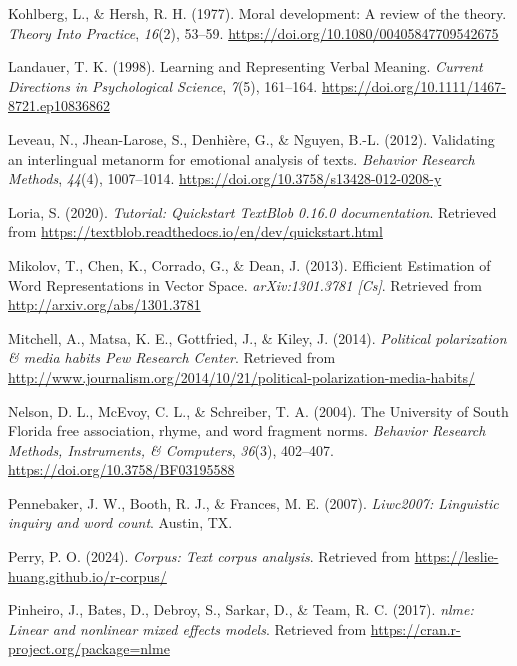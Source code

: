 \documentclass[
  man,floatsintext]{apa6}
\newlength{\cslhangindent}
\newenvironment{CSLReferences}[2] %
 {\begin{list}{}{%
  \setlength{\itemindent}{0pt}
  \setlength{\leftmargin}{0pt}
  \setlength{\parsep}{0pt}
  \ifodd #1
   \setlength{\leftmargin}{\cslhangindent}
   \setlength{\itemindent}{-1\cslhangindent}
  \fi
  \setlength{\itemsep}{#2\baselineskip}}}
 {\end{list}}
\begin{document}
\begin{CSLReferences}{1}{0}
Kohlberg, L., \& Hersh, R. H. (1977). {Moral development: A review of the theory}. \emph{Theory Into Practice}, \emph{16}(2), 53--59. \url{https://doi.org/10.1080/00405847709542675}

Landauer, T. K. (1998). {Learning and Representing Verbal Meaning}. \emph{Current Directions in Psychological Science}, \emph{7}(5), 161--164. \url{https://doi.org/10.1111/1467-8721.ep10836862}

Leveau, N., Jhean-Larose, S., Denhière, G., \& Nguyen, B.-L. (2012). Validating an interlingual metanorm for emotional analysis of texts. \emph{Behavior Research Methods}, \emph{44}(4), 1007--1014. \url{https://doi.org/10.3758/s13428-012-0208-y}

Loria, S. (2020). \emph{Tutorial: Quickstart {\textemdash} TextBlob 0.16.0 documentation}. Retrieved from \url{https://textblob.readthedocs.io/en/dev/quickstart.html}

Mikolov, T., Chen, K., Corrado, G., \& Dean, J. (2013). Efficient {Estimation} of {Word} {Representations} in {Vector} {Space}. \emph{arXiv:1301.3781 {[}Cs{]}}. Retrieved from \url{http://arxiv.org/abs/1301.3781}

Mitchell, A., Matsa, K. E., Gottfried, J., \& Kiley, J. (2014). \emph{{Political polarization {\&} media habits \textbar{} Pew Research Center}}. Retrieved from \url{http://www.journalism.org/2014/10/21/political-polarization-media-habits/}

Nelson, D. L., McEvoy, C. L., \& Schreiber, T. A. (2004). The University of South Florida free association, rhyme, and word fragment norms. \emph{Behavior Research Methods, Instruments, \& Computers}, \emph{36}(3), 402--407. \url{https://doi.org/10.3758/BF03195588}

Pennebaker, J. W., Booth, R. J., \& Frances, M. E. (2007). \emph{{Liwc2007: Linguistic inquiry and word count}}. Austin, TX.

Perry, P. O. (2024). \emph{Corpus: Text corpus analysis}. Retrieved from \url{https://leslie-huang.github.io/r-corpus/}

Pinheiro, J., Bates, D., Debroy, S., Sarkar, D., \& Team, R. C. (2017). \emph{{nlme: Linear and nonlinear mixed effects models}}. Retrieved from \url{https://cran.r-project.org/package=nlme}


\end{CSLReferences}
\end{document}
